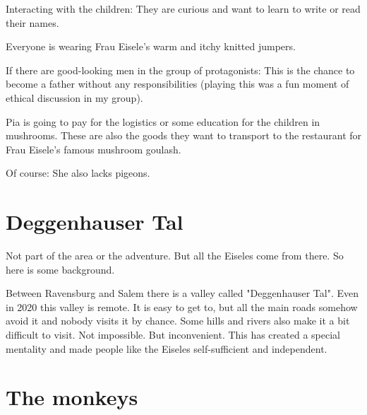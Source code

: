 Interacting with the children: They are curious and want to learn to write or read their names.

Everyone is wearing Frau Eisele's warm and itchy knitted jumpers.

If there are good-looking men in the group of protagonists: This is the chance to become a father without any responsibilities (playing this was a fun moment of ethical discussion in my group).

Pia is going to pay for the logistics or some education for the children in mushrooms. These are also the goods they want to transport to the restaurant for Frau Eisele's famous mushroom goulash.

Of course: She also lacks pigeons.


\section{Deggenhauser Tal}

Not part of the area or the adventure. But all the Eiseles come from there. So here is some background.

Between Ravensburg and Salem there is a valley called "Deggenhauser Tal". Even in 2020 this valley is remote. It is easy to get to, but all the main roads somehow avoid it and nobody visits it by chance. Some hills and rivers also make it a bit difficult to visit. Not impossible. But inconvenient. This has created a special mentality and made people like the Eiseles self-sufficient and independent.

\section{The monkeys}

